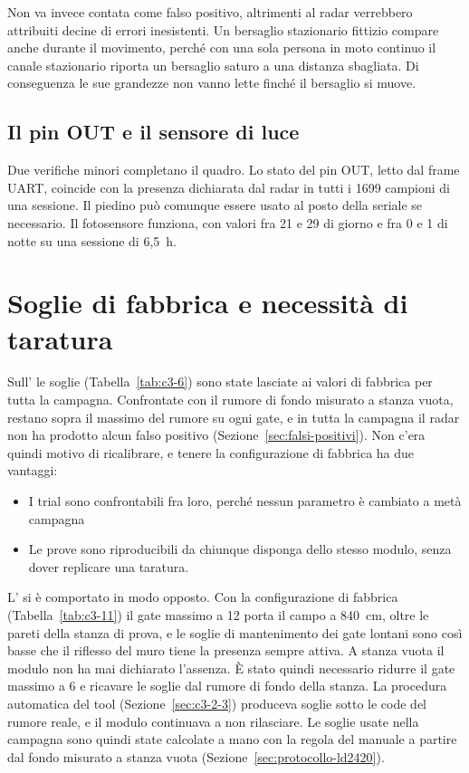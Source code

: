 Non va invece contata come falso positivo, altrimenti al radar verrebbero attribuiti decine di errori inesistenti. Un bersaglio stazionario fittizio compare anche durante il movimento, perché con una sola persona in moto continuo il canale stazionario riporta un bersaglio saturo a una distanza sbagliata. Di conseguenza le sue grandezze non vanno lette finché il bersaglio si muove.

\subsection{Il pin OUT e il sensore di luce}
\label{sec:c3-5-4}

Due verifiche minori completano il quadro. Lo stato del pin OUT, letto dal frame UART, coincide con la presenza dichiarata dal radar in tutti i 1699 campioni di una sessione. Il piedino può comunque essere usato al posto della seriale se necessario. Il fotosensore funziona, con valori fra 21 e 29 di giorno e fra 0 e 1 di notte su una sessione di 6,5~h.

\FloatBarrier
\section{Soglie di fabbrica e necessità di taratura}
\label{sec:c3-6}

Sull'\ldb{} le soglie (Tabella~\ref{tab:c3-6}) sono state lasciate ai valori di fabbrica per tutta la campagna. Confrontate con il rumore di fondo misurato a stanza vuota, restano sopra il massimo del rumore su ogni gate, e in tutta la campagna il radar non ha prodotto alcun falso positivo (Sezione~\ref{sec:falsi-positivi}). Non c'era quindi motivo di ricalibrare, e tenere la configurazione di fabbrica ha due vantaggi:

\begin{itemize}
  \item I trial sono confrontabili fra loro, perché nessun parametro è cambiato a metà campagna
  \item Le prove sono riproducibili da chiunque disponga dello stesso modulo, senza dover replicare una taratura.
\end{itemize}

L'\ldc{} si è comportato in modo opposto. Con la configurazione di fabbrica (Tabella~\ref{tab:c3-11}) il gate massimo a 12 porta il campo a 840~cm, oltre le pareti della stanza di prova, e le soglie di mantenimento dei gate lontani sono così basse che il riflesso del muro tiene la presenza sempre attiva. A stanza vuota il modulo non ha mai dichiarato l'assenza. È stato quindi necessario ridurre il gate massimo a 6 e ricavare le soglie dal rumore di fondo della stanza. La procedura automatica del tool (Sezione~\ref{sec:c3-2-3}) produceva soglie sotto le code del rumore reale, e il modulo continuava a non rilasciare. Le soglie usate nella campagna sono quindi state calcolate a mano con la regola del manuale a partire dal fondo misurato a stanza vuota (Sezione~\ref{sec:protocollo-ld2420}).
